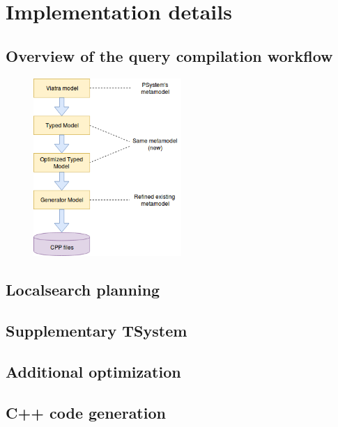 
\chapter{Implementation details}


\section{Overview of the query compilation workflow}

\begin{figure}[h]
	\begin{center}
	\includegraphics[width=0.5\textwidth]{figures/workflow.png}
	\end{center}
\end{figure}

\section{Localsearch planning}


\section{Supplementary TSystem}


\section{Additional optimization}


\section{C++ code generation}






